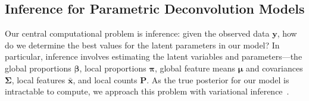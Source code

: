 \documentclass[twoside,11pt]{article}
\begin{document}
\subsection{Inference for Parametric Deconvolution Models}
\label{sec:parametric_inference}
Our central computational problem is inference: given the observed data $\boldsymbol{y}$, how do we determine the best values for the latent parameters in our model? In particular, inference involves estimating the latent variables and parameters---the global proportions $\boldsymbol{\beta}$, local proportions $\boldsymbol{\pi}$, global feature means $\boldsymbol{\mu}$ and covariances $\boldsymbol{\Sigma}$, local features $\boldsymbol{\bar{x}}$, and local counts $\boldsymbol{P}$.  As the true posterior for our model is intractable to compute, we approach this problem with variational inference~\citep{blei2017variational, Wainwright:2008}.
\end{document}

